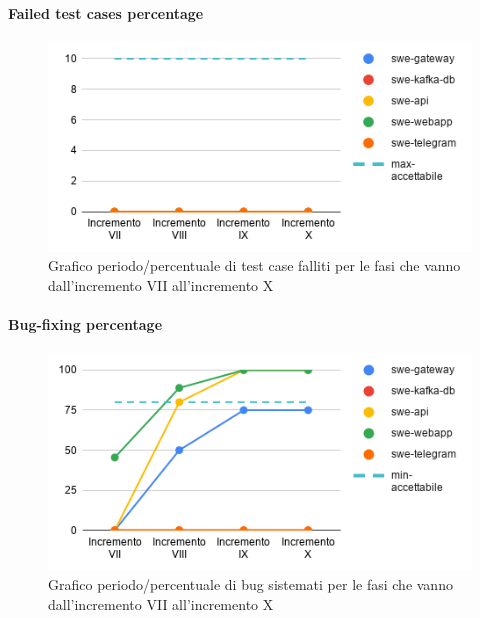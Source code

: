 \paragraph{Failed test cases percentage}
\begin{figure}[H]
			\centering
			\includegraphics[width=0.8\linewidth]{./res/images/QM-TEST-5-FTCP.png}
			\caption{Grafico periodo/percentuale di test case falliti per le fasi che vanno dall'incremento VII all'incremento X}
			\label{fig:Grafico periodo/percentuale di test case falliti per le fasi che vanno dall'incremento VII all'incremento X}
	\end{figure}
\paragraph{Bug-fixing percentage}
\begin{figure}[H]
			\centering
			\includegraphics[width=0.8\linewidth]{./res/images/QM-TEST-6-BFP.png}
			\caption{Grafico periodo/percentuale di bug sistemati per le fasi che vanno dall'incremento VII all'incremento X}
			\label{fig:Grafico periodo/percentuale di bug sistemati per le fasi che vanno dall'incremento VII all'incremento X}
	\end{figure}
